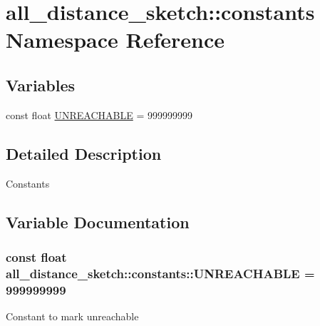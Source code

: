 \hypertarget{namespaceall__distance__sketch_1_1constants}{}\section{all\+\_\+distance\+\_\+sketch\+:\+:constants Namespace Reference}
\label{namespaceall__distance__sketch_1_1constants}
\subsection*{Variables}
\begin{DoxyCompactItemize}
\item 
const float \hyperlink{namespaceall__distance__sketch_1_1constants_ad55fbc1415d8bf353aaa21bd70c3077f}{U\+N\+R\+E\+A\+C\+H\+A\+B\+L\+E} = 999999999
\end{DoxyCompactItemize}


\subsection{Detailed Description}
Constants 

\subsection{Variable Documentation}
\hypertarget{namespaceall__distance__sketch_1_1constants_ad55fbc1415d8bf353aaa21bd70c3077f}{}
\subsubsection[{U\+N\+R\+E\+A\+C\+H\+A\+B\+L\+E}]{\setlength{\rightskip}{0pt plus 5cm}const float all\+\_\+distance\+\_\+sketch\+::constants\+::\+U\+N\+R\+E\+A\+C\+H\+A\+B\+L\+E = 999999999}\label{namespaceall__distance__sketch_1_1constants_ad55fbc1415d8bf353aaa21bd70c3077f}
Constant to mark unreachable 
